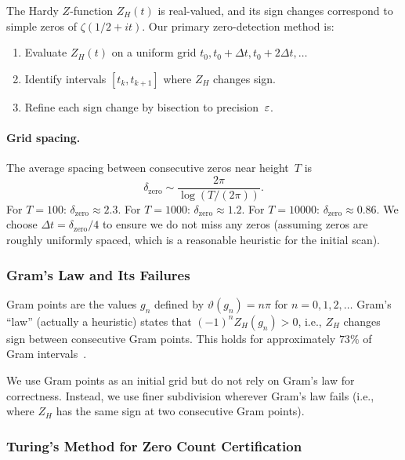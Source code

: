 The Hardy $Z$-function $Z_H(t)$ is real-valued, and its sign changes correspond to
simple zeros of $\zeta(1/2 + it)$. Our primary zero-detection method is:
\begin{enumerate}
  \item Evaluate $Z_H(t)$ on a uniform grid $t_0, t_0 + \Delta t, t_0 + 2\Delta t, \ldots$
  \item Identify intervals $[t_k, t_{k+1}]$ where $Z_H$ changes sign.
  \item Refine each sign change by bisection to precision~$\varepsilon$.
\end{enumerate}

\paragraph{Grid spacing.}
The average spacing between consecutive zeros near height~$T$ is
\begin{equation}\label{eq:zero-spacing}
  \delta_{\mathrm{zero}} \sim \frac{2\pi}{\log(T/(2\pi))}.
\end{equation}
For $T = 100$: $\delta_{\mathrm{zero}} \approx 2.3$. For $T = 1000$:
$\delta_{\mathrm{zero}} \approx 1.2$. For $T = 10000$:
$\delta_{\mathrm{zero}} \approx 0.86$. We choose $\Delta t = \delta_{\mathrm{zero}}/4$
to ensure we do not miss any zeros (assuming zeros are roughly uniformly spaced, which
is a reasonable heuristic for the initial scan).

\subsubsection{Gram's Law and Its Failures}
\label{sec:gram}

Gram points are the values $g_n$ defined by $\vartheta(g_n) = n\pi$ for
$n = 0, 1, 2, \ldots$ Gram's ``law'' (actually a heuristic) states that
$(-1)^n Z_H(g_n) > 0$, i.e., $Z_H$ changes sign between consecutive Gram
points. This holds for approximately $73\%$ of Gram
intervals~\cite{trudgian2011}.

We use Gram points as an initial grid but do not rely on Gram's law for correctness.
Instead, we use finer subdivision wherever Gram's law fails (i.e., where $Z_H$ has the
same sign at two consecutive Gram points).

\subsubsection{Turing's Method for Zero Count Certification}
\label{sec:turing}

